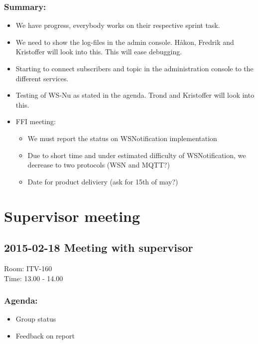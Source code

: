 \subsubsection*{Summary:}
\begin{itemize}
\setlength{\itemsep}{0cm}%
\item We have progress, everybody works on their respective sprint task. 
\item We need to show the log-files in the admin console. Håkon, Fredrik and Kristoffer will look into this. This will ease debugging. 
\item Starting to connect subscribers and topic in the administration console to the different services. 
\item Testing of WS-Nu as stated in the agenda. Trond and Kristoffer will look into this.
\item FFI meeting: \begin{itemize}
\setlength{\itemsep}{0cm}%
\item We must report the status on WSNotification implementation
\item Due to short time and under estimated difficulty of WSNotification, we decrease to two protocols (WSN and MQTT?)
\item Date for product deliviery (ask for 15th of  may?)	
\end{itemize}
\end{itemize}

\section{Supervisor meeting}

\subsection*{2015-02-18 Meeting with supervisor}
Room: ITV-160 \\
\noindent Time: 13.00 - 14.00

\subsubsection*{Agenda:}
\begin{itemize}
\setlength{\itemsep}{0cm}%
\item Group status
\item Feedback on report
\end{itemize}

